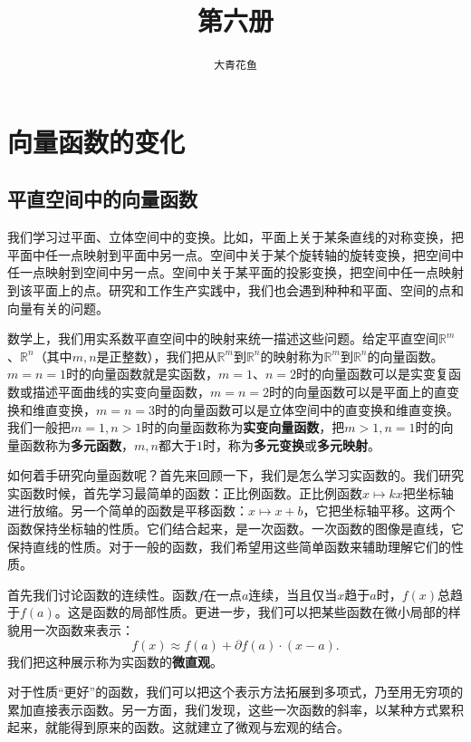 \documentclass[12pt,UTF8]{ctexbook}
\title{\zihao{0} \bfseries 第六册}
\author{\zihao{2} \texttt{大青花鱼}}
\date{}
\begin{document}
\maketitle
\tableofcontents
\newpage

\chapter{向量函数的变化}

\section{平直空间中的向量函数}

我们学习过平面、立体空间中的变换。比如，平面上关于某条直线的对称变换，把平面中任一点映射到平面中另一点。空间中关于某个旋转轴的旋转变换，把空间中任一点映射到空间中另一点。空间中关于某平面的投影变换，把空间中任一点映射到该平面上的点。研究和工作生产实践中，我们也会遇到种种和平面、空间的点和向量有关的问题。

\begin{ex}
\end{ex}

数学上，我们用实系数平直空间中的映射来统一描述这些问题。给定平直空间$\mathbb{R}^m$、$\mathbb{R}^n$（其中$m,n$是正整数），我们把从$\mathbb{R}^m$到$\mathbb{R}^n$的映射称为$\mathbb{R}^m$到$\mathbb{R}^n$的向量函数。$m=n=1$时的向量函数就是实函数，$m=1$、$n=2$时的向量函数可以是实变复函数或描述平面曲线的实变向量函数，$m=n=2$时的向量函数可以是平面上的直变换和维直变换，$m=n=3$时的向量函数可以是立体空间中的直变换和维直变换。我们一般把$m=1,n>1$时的向量函数称为\textbf{实变向量函数}，把$m>1,n=1$时的向量函数称为\textbf{多元函数}，$m,n$都大于$1$时，称为\textbf{多元变换}或\textbf{多元映射}。

如何着手研究向量函数呢？首先来回顾一下，我们是怎么学习实函数的。我们研究实函数时候，首先学习最简单的函数：正比例函数。正比例函数$x\mapsto kx$把坐标轴进行放缩。另一个简单的函数是平移函数：$x \mapsto x + b$，它把坐标轴平移。这两个函数保持坐标轴的性质。它们结合起来，是一次函数。一次函数的图像是直线，它保持直线的性质。对于一般的函数，我们希望用这些简单函数来辅助理解它们的性质。

首先我们讨论函数的连续性。函数$f$在一点$a$连续，当且仅当$x$趋于$a$时，$f(x)$总趋于$f(a)$。这是函数的局部性质。更进一步，我们可以把某些函数在微小局部的样貌用一次函数来表示：
$$ f(x) \approx f(a) + \partial f(a) \cdot (x - a).$$
我们把这种展示称为实函数的\textbf{微直观}。

对于性质“更好”的函数，我们可以把这个表示方法拓展到多项式，乃至用无穷项的累加直接表示函数。另一方面，我们发现，这些一次函数的斜率，以某种方式累积起来，就能得到原来的函数。这就建立了微观与宏观的结合。
\end{document}
